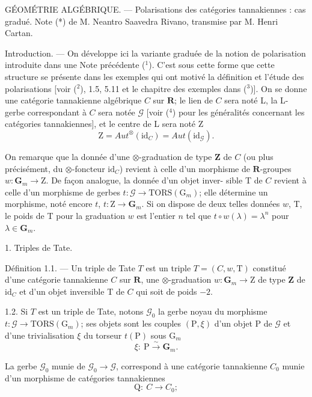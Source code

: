\documentclass[11pt]{article}
\begin{document}
GÉOMÉTRIE ALGÉBRIQUE. --- Polarisations des catégories tannakiennes :
cas gradué. Note (*) de M. Neantro Saavedra Rivano, transmise par
M. Henri Cartan.

Introduction. --- On développe ici la variante graduée de la notion
de polarisation introduite dans une Note précédente (${}^{1}$). C'est sous cette
forme que cette structure se présente dans les exemples qui ont motivé
la définition et l'étude des polarisations [voir (${}^{2}$), 1.5, 5.11 et le chapitre
des exemples dans (${}^{3}$)].
On se donne une catégorie tannakienne algébrique $C$ sur $\mathbf{R}$; le lien
de $C$ sera noté L, la L-gerbe correspondant à $C$ sera notée $\mathcal{G}$ [voir (${}^{4}$)
pour les généralités concernant les catégories tannakiennes], et le centre
de L sera noté Z
\[ \mathrm{Z} = \mathit{Aut}^{\otimes}(\mathrm{id}_{C}) = \mathit{Aut}(\mathrm{id}_{\mathcal{G}}). \]

On remarque que la donnée d'une $\otimes$-graduation de type $\mathbf{Z}$ de $C$ (ou plus
précisément, du $\otimes$-foncteur $\mathrm{id}_{C}$) revient à celle d'un morphisme de
$\mathbf{R}$-groupes $w : \mathbf{G}_{m} \to \mathrm{Z}$. De façon analogue, la donnée d'un objet inver-%
sible T de $C$ revient à celle d'un morphisme de gerbes $t : \mathcal{G} \to \mathrm{TORS}(\mathrm{G}_{m})$;
elle détermine un morphisme, noté encore $t$, $t : \mathrm{Z} \to \mathbf{G}_{m}$. Si on dispose
de deux telles données $w$, T, le poids de T pour la graduation $w$ est
l'entier $n$ tel que $t \circ w(\lambda) = \lambda^{n}$ pour $\lambda \in \mathbf{G}_{m}$.

1. Triples de Tate.

Définition 1.1. --- Un triple de Tate $T$ est un triple $T = (C, w, \mathrm{T})$
constitué d'une catégorie tannakienne $C$ sur $\mathbf{R}$, une $\otimes$-graduation
$w : \mathbf{G}_{m} \to \mathrm{Z}$ de type $\mathbf{Z}$ de $\mathrm{id}_{C}$ et d'un objet inversible T de $C$ qui soit
de poids $-2$.

1.2. Si $T$ est un triple de Tate, notons $\mathcal{G}_{0}$ la gerbe noyau du morphisme
$t : \mathcal{G} \to \mathrm{TORS}(\mathrm{G}_{m})$; ses objets sont les couples $(\mathrm{P}, \xi)$ d'un objet P
de $\mathcal{G}$ et d'une trivialisation $\xi$ du torseur $t(\mathrm{P})$ sous $\mathrm{G}_{m}$
\[ \xi : \ \mathrm{P} \xrightarrow{\sim} \mathbf{G}_{m}. \]

La gerbe $\mathcal{G}_{0}$ munie de $\mathcal{G}_{0} \to \mathcal{G}$, correspond à une catégorie tannakienne $C_{0}$
munie d'un morphisme de catégories tannakiennes
\[ \mathrm{Q} : \ C \to C_{0}; \]
\end{document}
